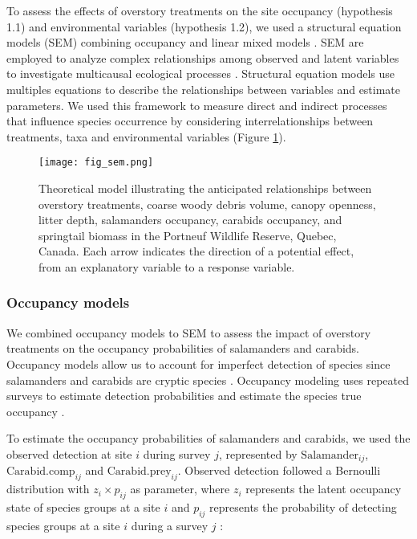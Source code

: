 To assess the effects of overstory treatments on the site occupancy (hypothesis 1.1) and environmental variables (hypothesis 1.2), we used a structural equation models (SEM) 
combining occupancy and linear mixed models \citep{graceSpecificationStructuralEquation2010,josephIntegratingOccupancyModels2016,mackenzieOccupancyEstimationModeling2006a}.
SEM are employed to analyze complex relationships among observed and latent variables to investigate multicausal ecological processes \citep{graceStructuralEquationModeling2008}.
Structural equation models use multiples equations to describe the relationships between variables and estimate parameters.
We used this framework to measure direct and indirect processes that influence species occurrence by considering interrelationships between treatments, taxa and environmental variables (Figure \ref*{fig:SEM}).

\begin{figure}[ht]
	\centering
	\texttt{[image: fig\_sem.png]}
	\caption[Theoretical model illustrating the anticipated relationships between overstory treatments, environmental variables and species groups.]
  {Theoretical model illustrating the anticipated relationships between overstory treatments, coarse woody debris volume, canopy openness, litter depth,
   salamanders occupancy, carabids occupancy, and springtail biomass in the Portneuf Wildlife Reserve, Quebec, Canada. 
   Each arrow indicates the direction of a potential effect, from an explanatory variable to a response variable.}
	\label{fig:SEM}
\end{figure}  

\subsubsection{Occupancy models} 

We combined occupancy models to SEM to assess the impact of overstory treatments on the occupancy probabilities of salamanders and carabids.
Occupancy models allow us to account for imperfect detection of species since salamanders and carabids are cryptic species \citep{baileyEstimatingSiteOccupancy2004,spiersEstimatingSpeciesMisclassification2022}.
Occupancy modeling uses repeated surveys to estimate detection probabilities and estimate the species true occupancy \citep{mackenzieEstimatingSiteOccupancy2002,mazerolleMakingGreatLeaps2007}.

To estimate the occupancy probabilities of salamanders and carabids, we used the observed detection at site $i$ during survey $j$, 
represented by $\text{Salamander}_{ij}$, $\text{Carabid.comp}_{ij}$ and $\text{Carabid.prey}_{ij}$. Observed detection followed a Bernoulli distribution with $z_{i} \times p_{ij}$ as parameter, 
where $z_{i}$ represents the latent occupancy state of species groups at a site $i$ and $p_{ij}$ represents the probability of detecting species groups at a site $i$ during a survey $j$ :


